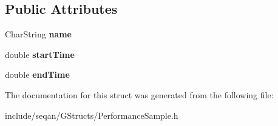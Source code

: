 \subsection*{\-Public \-Attributes}
\begin{DoxyCompactItemize}
\item 
\hypertarget{structseqan_1_1_performance_sample_ad57c1dc73d7aeead774dc52c2bc9c21e}{\-Char\-String {\bfseries name}}\label{structseqan_1_1_performance_sample_ad57c1dc73d7aeead774dc52c2bc9c21e}

\item 
\hypertarget{structseqan_1_1_performance_sample_aa836fab9103241ea23d5da5642aea14f}{double {\bfseries start\-Time}}\label{structseqan_1_1_performance_sample_aa836fab9103241ea23d5da5642aea14f}

\item 
\hypertarget{structseqan_1_1_performance_sample_a56846d44d5d90ff877cb09ac3a50408d}{double {\bfseries end\-Time}}\label{structseqan_1_1_performance_sample_a56846d44d5d90ff877cb09ac3a50408d}

\end{DoxyCompactItemize}


\-The documentation for this struct was generated from the following file\-:\begin{DoxyCompactItemize}
\item 
include/seqan/\-G\-Structs/\-Performance\-Sample.\-h\end{DoxyCompactItemize}
